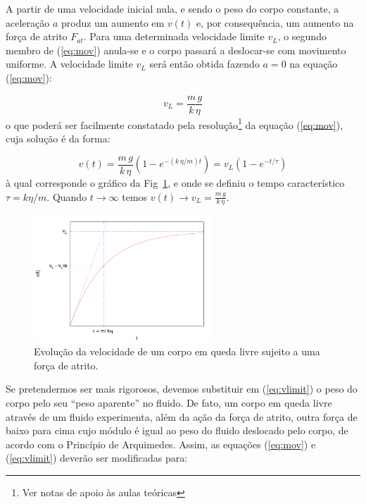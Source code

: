 \documentclass[a4paper,twoside,12pt]{article}      %
\begin{document}
A partir de uma velocidade inicial nula, e sendo o peso do corpo constante, a aceleração $a$ produz um aumento  em $v(t)$ e, por consequência, um aumento na força de atrito $F_{at}$. Para uma determinada velocidade limite $v_L$, o segundo membro de (\ref{eq:mov}) anula-se e o corpo passará a deslocar-se com movimento uniforme. A velocidade limite $v_L$ será então obtida fazendo $a= 0$ na equação (\ref{eq:mov}):

\begin{equation}
	\label{eq:vlimit}
	v_L = \frac{m\,g}{k  \, \eta}
\end{equation}
o que poderá ser facilmente constatado pela resolução\footnote{Ver notas de apoio às aulas teóricas} da equação (\ref{eq:mov}), cuja solução é da forma:

\begin{equation}
	\label{eq:vlimita}
	v(t) = \frac{m\,g}{k  \, \eta} (1 - e^{- (k\,\eta / m) t}) = v_L (1-e^{-t/\tau})
\end{equation}
à qual corresponde o gráfico  da Fig~\ref{fig:vLim}, e onde se definiu o tempo característico $\tau=k\eta/m$. Quando $t \to \infty$ temos $v(t) \to v_L = \frac{m\,g}{k  \, \eta} $.



\begin{figure}[tb]
  \centering 
	\includegraphics[width=0.6\textwidth]{./plote}
	\caption{ Evolução da velocidade de um corpo em queda livre sujeito a uma força de atrito. \label{fig:vLim}} 
\end{figure}


Se pretendermos ser mais rigorosos, devemos substituir  em (\ref{eq:vlimit}) o peso do corpo pelo seu “peso aparente” no fluido. De fato, um corpo em queda livre através de um fluido experimenta, além da ação da força de atrito, outra força de baixo para cima cujo módulo é igual ao peso do fluido deslocado pelo corpo, de acordo com o Princípio de Arquimedes. Assim, as equações (\ref{eq:mov}) e (\ref{eq:vlimit}) deverão ser modificadas para:
\end{document}
